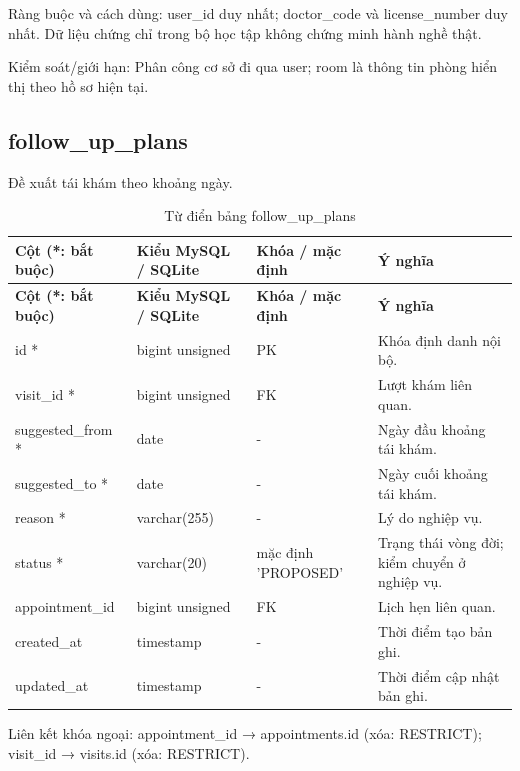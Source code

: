 Ràng buộc và cách dùng:\allowbreak{} user\_\allowbreak{}id duy nhất; doctor\_\allowbreak{}code và license\_\allowbreak{}number duy nhất.\allowbreak{} Dữ liệu chứng chỉ trong bộ học tập không chứng minh hành nghề thật.\allowbreak{}

Kiểm soát/\allowbreak{}giới hạn:\allowbreak{} Phân công cơ sở đi qua user; room là thông tin phòng hiển thị theo hồ sơ hiện tại.\allowbreak{}

\clearpage

\subsection{follow\_\allowbreak{}up\_\allowbreak{}plans}
Đề xuất tái khám theo khoảng ngày.\allowbreak{}


{\fontsize{10}{12}\selectfont\setlength{\tabcolsep}{3pt}\renewcommand{\arraystretch}{1.12}
\begin{longtable}{@{}L{\textwidth-4.86pt\relax} L{\textwidth-3.96pt\relax} L{\textwidth-2.88pt\relax} L{\textwidth-6.3pt\relax}@{}}
\caption{Từ điển bảng follow\_\allowbreak{}up\_\allowbreak{}plans}\\
\toprule
\textbf{Cột (*:\allowbreak{} bắt buộc)} & \textbf{Kiểu My\allowbreak{}SQL /\allowbreak{} SQLite} & \textbf{Khóa /\allowbreak{} mặc định} & \textbf{Ý nghĩa}\\\midrule
\endfirsthead
\toprule
\textbf{Cột (*:\allowbreak{} bắt buộc)} & \textbf{Kiểu My\allowbreak{}SQL /\allowbreak{} SQLite} & \textbf{Khóa /\allowbreak{} mặc định} & \textbf{Ý nghĩa}\\\midrule
\endhead
\bottomrule\endlastfoot
id * & bigint unsigned & PK & Khóa định danh nội bộ.\allowbreak{}\\[1pt]
visit\_\allowbreak{}id * & bigint unsigned & FK & Lượt khám liên quan.\allowbreak{}\\[1pt]
suggested\_\allowbreak{}from * & date & - & Ngày đầu khoảng tái khám.\allowbreak{}\\[1pt]
suggested\_\allowbreak{}to * & date & - & Ngày cuối khoảng tái khám.\allowbreak{}\\[1pt]
reason * & varchar(255) & - & Lý do nghiệp vụ.\allowbreak{}\\[1pt]
status * & varchar(20) & mặc định 'PROPOSED' & Trạng thái vòng đời; kiểm chuyển ở nghiệp vụ.\allowbreak{}\\[1pt]
appointment\_\allowbreak{}id & bigint unsigned & FK & Lịch hẹn liên quan.\allowbreak{}\\[1pt]
created\_\allowbreak{}at & timestamp & - & Thời điểm tạo bản ghi.\allowbreak{}\\[1pt]
updated\_\allowbreak{}at & timestamp & - & Thời điểm cập nhật bản ghi.\allowbreak{}\\[1pt]
\end{longtable}}
Liên kết khóa ngoại:\allowbreak{} appointment\_\allowbreak{}id → appointments.\allowbreak{}id (xóa:\allowbreak{} RESTRICT); visit\_\allowbreak{}id → visits.\allowbreak{}id (xóa:\allowbreak{} RESTRICT).\allowbreak{}

